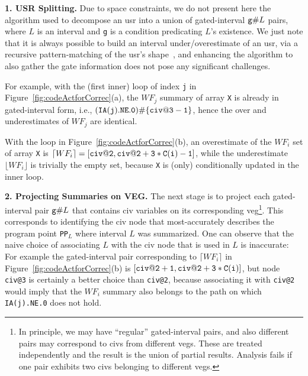 \documentclass{sig-alternate}
\begin{document}
\vspace{1ex}

{\bf 1. USR Splitting.}
Due to space constraints, we do not present here
the algorithm used to decompose an {\sc usr} into a union of 
gated-interval ${\tt g}\#L$ pairs, where $L$ is an interval and 
{\tt g} is a condition predicating $L$'s existence.  
We just note that it is always possible to build an interval
under/overestimate of an {\sc usr}, via a recursive pattern-matching of 
the {\sc usr}'s shape~\cite{SummaryMonot}, and enhancing the algorithm to 
also gather the gate information does not pose any significant challenges.   

For example, with the (first inner) loop of index {\tt j} in Figure~\ref{fig:codeActforCorrec}(a), 
the $WF_j$ summary of array {\tt X} is already in gated-interval form, i.e., 
${\tt (IA(j).NE.0)}\#\{{\tt civ@3-1}\}$,
hence the over and underestimates of $WF_j$ are identical. 

With the loop in Figure~\ref{fig:codeActforCorrec}(b), an overestimate 
of the $WF_i$ set of array {\tt X}  is 
$\lceil WF_i\rceil=[{\tt civ@2, civ@2+3*C(i)-1}]$,
while the underestimate $\lfloor WF_i\rfloor$ is trivially the empty set,
because {\tt X} is (only) conditionally updated in the inner loop.


\vspace{1ex}

{\bf 2. Projecting Summaries on VEG.}
The next stage is to project each gated-interval pair ${\tt g}\#L$ 
that contains {\sc civ} variables on its corresponding {\sc veg}\footnote{  
In principle, we may have ``regular'' gated-interval pairs, and also 
different pairs may correspond to {\sc civ}s from different {\sc veg}s. 
These are treated independently and the result is the union of partial results.
Analysis fails if one pair exhibits two {\sc civ}s belonging
to different {\sc veg}s.}. 
This corresponds to identifying the {\sc civ} node
that most-accurately describes the program point {\tt PP$_L$} 
where interval $L$ was summarized. 
One can observe that the naive choice of associating $L$ with the {\sc civ}
node that is used in $L$ is inaccurate: For example the gated-interval pair
corresponding to $\lceil WF_i \rceil$ in Figure~\ref{fig:codeActforCorrec}(b) 
is $[{\tt civ@2+1, civ@2+3*C(i)}]$, but node {\tt civ@3} 
is certainly a better choice than {\tt civ@2}, because associating
it with {\tt civ@2} would imply that the $WF_i$ summary also belongs 
to the path on which {\tt IA(j).NE.0} does not hold. 
\end{document}
